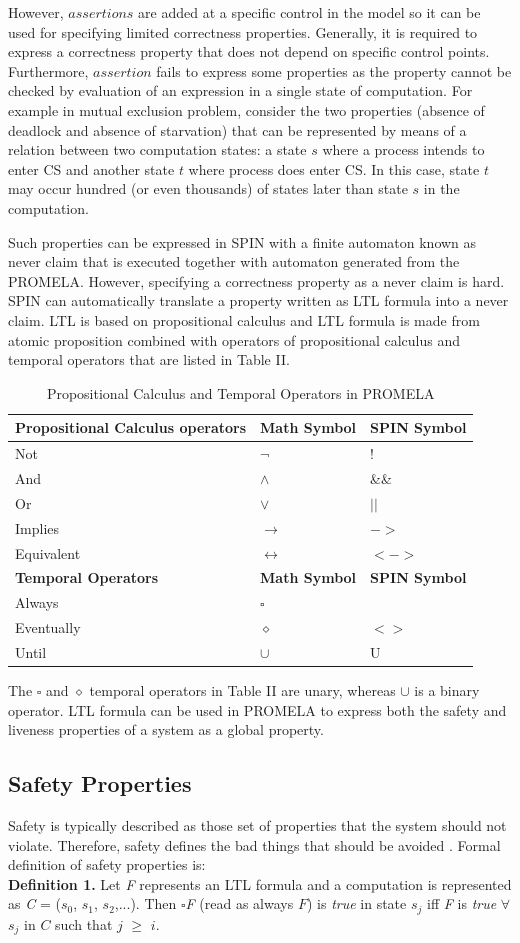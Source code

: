 \documentclass[conference]{IEEEtran}
\begin{document}
However, $assertions$ are added at a specific control in the model so it can be used for specifying limited correctness properties. 
Generally, it is required to express a correctness property that does not depend on specific control points. Furthermore, $assertion$ fails 
to express some properties as the property cannot be checked by evaluation of an expression in a single state of computation. For example in
mutual exclusion problem, consider the two properties (absence of deadlock and absence of starvation) that can be represented by means of a 
relation between two computation states: a state $s$ where a process intends to enter CS and another state $t$ where process does enter CS. In this 
case, state $t$ may occur hundred (or even thousands) of states later than state $s$ in the computation. 

Such properties can be expressed in SPIN with a finite automaton known as never claim that is executed together with automaton generated from 
the PROMELA. However, specifying a correctness property as a never claim is hard. SPIN can automatically translate a property written as LTL 
formula into a never claim.  LTL is based on propositional calculus and LTL formula is made from atomic proposition combined with operators of 
propositional calculus and temporal operators that are listed in Table II.
\begin{table}[!ht]
\caption{Propositional Calculus and Temporal Operators in PROMELA}
\centering
 \begin{tabular}{|>{\centering}p{2.5cm}|>{\centering} p{2cm} |>{\centering} p{2cm} |}
 \hline
\textbf{Propositional Calculus operators} & \textbf{Math Symbol} & \textbf{SPIN Symbol}\tabularnewline
\hline
Not & $\neg$ & !\tabularnewline
And & $\land$ & \&\&\tabularnewline
Or & $\lor$ &$||$\tabularnewline
Implies & $\rightarrow$ & $->$\tabularnewline
Equivalent & $\leftrightarrow$ & $<->$\tabularnewline
\hline
\textbf{Temporal Operators} & \textbf{Math Symbol} & \textbf{SPIN Symbol}\tabularnewline
\hline
Always & $\square$ & [ ]\tabularnewline
Eventually & $\diamond$ & $<>$\tabularnewline
Until & $\cup$ & U\tabularnewline
\hline
\end{tabular}    
\end{table}

The $\square$ and $\diamond$  temporal operators in Table II are unary, whereas $\cup$ is a binary operator. 
LTL formula can be used in PROMELA to express both the safety and liveness properties of a system as a global property. 

\subsection{Safety Properties}
Safety is typically described as those set of properties that the system should not violate. Therefore, 
safety defines the bad things that should be avoided \cite{17}. Formal definition of safety properties is: \\
\textbf{Definition 1.} Let \emph{F} represents an LTL formula and a computation is represented as \emph{C} 
= ($s_0$, $s_1$, $s_2$,...). Then $\square$\emph{F} (read as always $F$) is \emph{true} in state $s_j$ iff \emph{F} is \emph{true} $\forall$ 
$s_j$ in $C$ such that $j$ $\geq$ $i$.
\end{document}
